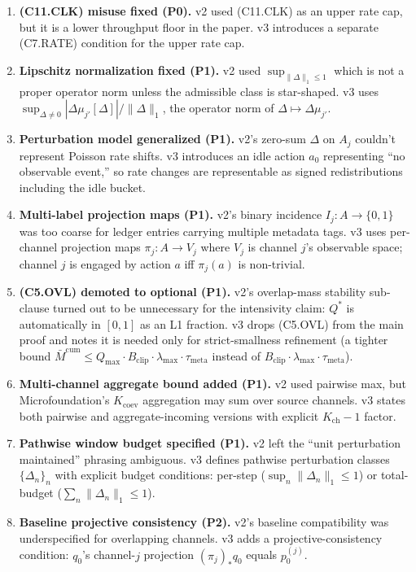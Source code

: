 \documentclass{article}
\newcommand{\Bclip}{B_{\mathrm{clip}}}
\newcommand{\Kch}{K_{\mathrm{ch}}}
\newcommand{\lammax}{\lambda_{\max}}
\newcommand{\taumeta}{\tau_{\mathrm{meta}}}
\begin{document}
\begin{enumerate}
\item \textbf{(C11.CLK) misuse fixed (P0).}  v2 used (C11.CLK) as
  an upper rate cap, but it is a lower throughput floor in the
  paper.  v3 introduces a separate (C7.RATE) condition for the
  upper rate cap.

\item \textbf{Lipschitz normalization fixed (P1).}  v2 used
  $\sup_{\|\Delta\|_1 \leq 1}$ which is not a proper operator norm
  unless the admissible class is star-shaped.  v3 uses
  $\sup_{\Delta \neq 0} |\Delta\mu_{j'}[\Delta]| / \|\Delta\|_1$,
  the operator norm of $\Delta \mapsto \Delta\mu_{j'}$.

\item \textbf{Perturbation model generalized (P1).}  v2's zero-sum
  $\Delta$ on $A_j$ couldn't represent Poisson rate shifts.  v3
  introduces an idle action $a_0$ representing
  ``no observable event,'' so rate changes are representable as
  signed redistributions including the idle bucket.

\item \textbf{Multi-label projection maps (P1).}  v2's binary
  incidence $I_j: A \to \{0,1\}$ was too coarse for ledger entries
  carrying multiple metadata tags.  v3 uses per-channel projection
  maps $\pi_j: A \to V_j$ where $V_j$ is channel $j$'s observable
  space; channel $j$ is engaged by action $a$ iff $\pi_j(a)$ is
  non-trivial.

\item \textbf{(C5.OVL) demoted to optional (P1).}  v2's
  overlap-mass stability sub-clause turned out to be unnecessary
  for the intensivity claim: $Q^*$ is automatically in $[0,1]$ as
  an L1 fraction.  v3 drops (C5.OVL) from the main proof and notes
  it is needed only for strict-smallness refinement (a tighter
  bound $\bar{M}^{\mathrm{cum}} \leq Q_{\max} \cdot \Bclip \cdot
  \lammax \cdot \taumeta$ instead of $\Bclip \cdot \lammax \cdot
  \taumeta$).

\item \textbf{Multi-channel aggregate bound added (P1).}  v2 used
  pairwise max, but Microfoundation's $K_{\mathrm{coev}}$
  aggregation may sum over source channels.  v3 states both
  pairwise and aggregate-incoming versions with explicit $\Kch -
  1$ factor.

\item \textbf{Pathwise window budget specified (P1).}  v2 left the
  ``unit perturbation maintained'' phrasing ambiguous.  v3 defines
  pathwise perturbation classes $\{\Delta_n\}_n$ with explicit
  budget conditions: per-step ($\sup_n \|\Delta_n\|_1 \leq 1$) or
  total-budget ($\sum_n \|\Delta_n\|_1 \leq 1$).

\item \textbf{Baseline projective consistency (P2).}  v2's
  baseline compatibility was underspecified for overlapping
  channels.  v3 adds a projective-consistency condition: $q_0$'s
  channel-$j$ projection $(\pi_j)_* q_0$ equals $p_0^{(j)}$.
\end{enumerate}
\end{document}
